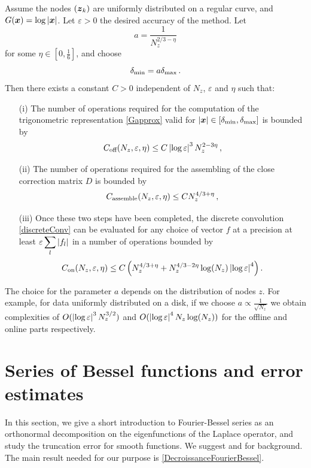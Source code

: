 \documentclass[smallextended]{svjour3}
\begin{document}
\begin{theorem} Assume the nodes $(\boldsymbol{z}_k)$ are uniformly distributed on a regular curve, and $G(\boldsymbol{x}) = \log \left\lvert \boldsymbol{x} \right\rvert$. Let $\varepsilon > 0$ the desired accuracy of the method. Let 
	\[a =\dfrac{1}{N_z^{2/3 - \eta}}\]
	for some $\eta \in \left[0,\frac{1}{6}\right]$, and choose 
	\[\delta_{\min} = a \delta_{\max} \,.\] 
	Then there exists a constant $C>0$ independent of $N_z$, $\varepsilon$ and $\eta$ such that:
	\label{The:GlobalComplexity}
	\begin{itemize}
		\item[(i)] The number of operations required for the computation of the trigonometric representation \eqref{Gapprox} valid for $\left\lvert \boldsymbol{x} \right\rvert \in [\delta_{\min},\delta_{\max}]$  is bounded by 
		      \[ C_{\textup{off}}(N_z,\varepsilon,\eta) \leq C \left\lvert \log \varepsilon \right\rvert^3 N_z^{2 - 3\eta}\,,\]
		\item[(ii)] The number of operations required for the assembling of the close correction matrix $D$ is bounded by
		      \[C_{\textup{assemble}}(N_z,\varepsilon,\eta)\leq C  N_z^{4/3 + \eta}\,,\]
		\item[(iii)] Once these two steps have been completed, the discrete convolution \eqref{discreteConv} can be evaluated for any choice of vector $f$ at a precision at least $\varepsilon \displaystyle\sum_l \left\lvert f_l \right\rvert$ in a number of operations bounded by
		      \[C_{\textup{on}}(N_z,\varepsilon,\eta) \leq C \left(  N_z ^{4/3 + \eta} + N_z^{4/3 - 2\eta} \log(N_z) \left\lvert \log \varepsilon \right\rvert^4 \right).\] 
	\end{itemize} 
\end{theorem}

The choice for the parameter $a$ depends on the distribution of nodes $z$. For example, for data uniformly distributed on a disk, if we choose $a \propto \frac{1}{\sqrt{N_z}}$ we obtain complexities of $O(\left\lvert \log \varepsilon \right\rvert^3  N_z^{3/2})$ and $O(\left\lvert \log \varepsilon \right\rvert^4 N_z\log(N_z))$ for the offline and online parts respectively. 


\section{Series of Bessel functions and error estimates}
\label{sec:FourierBesselSeries}
In this section, we give a short introduction to Fourier-Bessel series as an orthonormal decomposition on the eigenfunctions of the Laplace operator, and study the truncation error for smooth functions. We suggest \cite{abramowitz1964handbook,NIST:DLMF} and \cite[chap. 18]{watson1995treatise} for background. The main result needed for our purpose is \autoref{DecroissanceFourierBessel}. 
\end{document}
